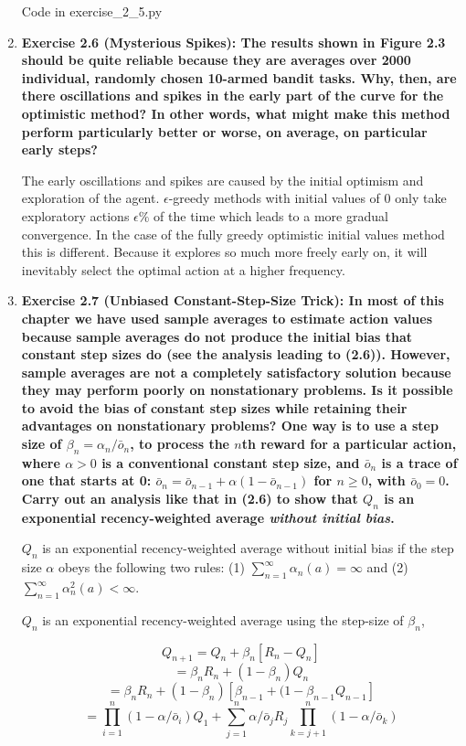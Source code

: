 \documentclass[11pt]{article}
\begin{document}
\begin{enumerate}
		Code in exercise\_2\_5.py
		
		\item \textbf{Exercise 2.6 (Mysterious Spikes): The results shown in Figure 2.3 should be quite reliable because they are averages over 2000 individual, randomly chosen
		10-armed bandit tasks. Why, then, are there oscillations and spikes in the early part of the curve for the optimistic method? In other words, what might make this method
		perform particularly better or worse, on average, on particular early steps?}
		
		The early oscillations and spikes are caused by the initial optimism and exploration of the agent. $\epsilon$-greedy methods with initial values of 0 only take exploratory
		actions $\epsilon\%$ of the time which leads to a more gradual convergence. In the case of the fully greedy optimistic initial values method this is different. Because it
		explores so much more freely early on, it will inevitably select the optimal action at a higher frequency.
		
		\item \textbf{Exercise 2.7 (Unbiased Constant-Step-Size Trick): In most of this chapter we have used sample averages to estimate action values because sample averages do
		not produce the initial bias that constant step sizes do (see the analysis leading to (2.6)). However, sample averages are not a completely satisfactory solution because
		they may perform poorly on nonstationary problems. Is it possible to avoid the bias of constant step sizes while retaining their advantages on nonstationary problems? One
		way is to use a step size of $\beta_n=\alpha_n/\bar{o}_n$, to process the $n$th reward for a particular action, where $\alpha>0$ is a conventional constant step size, and
		$\bar{o}_n$ is a trace of one that starts at 0: $\bar{o}_n=\bar{o}_{n-1}+\alpha(1-\bar{o}_{n-1})$ for $n\geq0$, with $\bar{o}_0=0$. Carry out an analysis like that in
		(2.6) to show that $Q_n$ is an exponential recency-weighted average \textit{without initial bias}.}
		
		$Q_n$ is an exponential recency-weighted average without initial bias if the step size $\alpha$ obeys the following two rules: (1) $\sum_{n=1}^\infty\alpha_n(a)=\infty$
		and (2) $\sum_{n=1}^\infty \alpha^2_n(a)<\infty$.
		
		$Q_n$ is an exponential recency-weighted average using the step-size of $\beta_n$,
		
		$$Q_{n+1}=Q_n+\beta_n[R_n-Q_n]$$
		$$=\beta_nR_n+(1-\beta_n)Q_n$$
		$$=\beta_nR_n+(1-\beta_n)[\beta_{n-1}+(1-\beta_{n-1}Q_{n-1}]$$
		$$=\prod_{i=1}^n(1-\alpha/\bar{o}_i)Q_1 + \sum_{j=1}^n\alpha/\bar{o}_jR_j\prod_{k=j+1}^n(1-\alpha/\bar{o}_k)$$
		

\end{enumerate}
\end{document}
